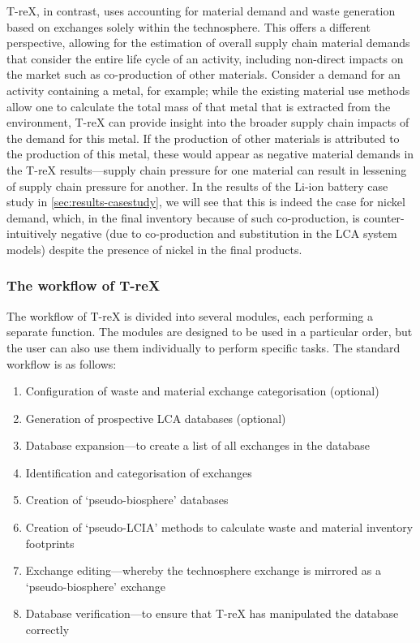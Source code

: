 T-reX, in contrast, uses accounting for material demand and waste generation based on exchanges solely within the technosphere. This offers a different perspective, allowing for the estimation of overall supply chain material demands that consider the entire life cycle of an activity, including non-direct impacts on the market such as co-production of other materials. Consider a demand for an activity containing a metal, for example; while the existing material use methods allow one to calculate the total mass of that metal that is extracted from the environment, T-reX can provide insight into the broader supply chain impacts of the demand for this metal. If the production of other materials is attributed to the production of this metal, these would appear as negative material demands in the T-reX results---supply chain pressure for one material can result in lessening of supply chain pressure for another. In the results of the Li-ion battery case study in \autoref{sec:results-casestudy}, we will see that this is indeed the case for nickel demand, which, in the final inventory because of such co-production, is counter-intuitively negative (due to co-production and substitution in the LCA system models) despite the presence of nickel in the final products.



\subsubsection{The workflow of T-reX}

The workflow of T-reX is divided into several modules, each performing a separate function. The modules are designed to be used in a particular order, but the user can also use them individually to perform specific tasks. The standard workflow is as follows:

\begin{enumerate}
    \item Configuration of waste and material exchange categorisation (optional)
    \item Generation of prospective LCA databases (optional)
    \item Database expansion---to create a list of all exchanges in the database
    \item Identification and categorisation of exchanges
    \item Creation of `pseudo-biosphere' databases
    \item Creation of `pseudo-LCIA' methods to calculate waste and material inventory footprints
    \item Exchange editing---whereby the technosphere exchange is mirrored as a `pseudo-biosphere' exchange
    \item Database verification---to ensure that T-reX has manipulated the database correctly
\end{enumerate}

